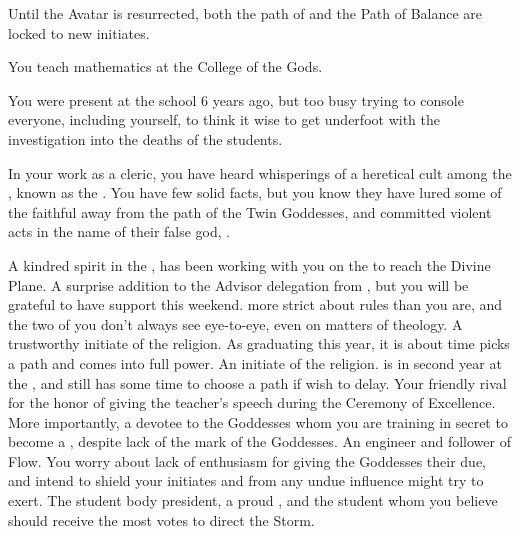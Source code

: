 \documentclass[char]{GL2020}
\begin{document}
\begin{itemz}[Notes]
	\item Until the \cEbb{} Avatar is resurrected, both the path of \cEbb{} and the Path of Balance are locked to new initiates.
	\item You teach mathematics at the College of the Gods.
	\item You were present at the school 6 years ago, but too busy trying to console everyone, including yourself, to think it wise to get underfoot with the investigation into the deaths of the students. 
	\item In your work as a cleric, you have heard whisperings of a heretical cult among the \pShip{}, known as the \pGoaties{}. You have few solid facts, but you know they have lured some of the faithful away from the path of the Twin Goddesses, and committed violent acts in the name of their false god, \cGenesis{}.
\end{itemz}

\begin{contacts}
	\contact{\cCurse{}} A kindred spirit in the \pFarm{}, \cCurse{} has been working with you on the \iBeansMB{} to reach the Divine Plane.
\contact{\cEbbPriest{}} A surprise addition to the Advisor delegation from \pShip{}, but you will be grateful to have \cEbbPriest{\their} support this weekend. \cEbbPriest{\Theyare} more strict about rules than you are, and the two of you don't always see eye-to-eye, even on matters of theology.
	\contact{\cInitiate{}} A trustworthy initiate of the \pShippies{} religion. As \cInitiate{\theyare} graduating this year, it is about time \cInitiate{} picks a path and comes into \cInitiate{\their} full power.
\contact{\cWarlordDaughter{}} An initiate of the \pShippies{} religion. \cWarlordDaughter{} is in \cWarlordDaughter{\their} second year at the \pSc{}, and still has some time to choose a path if \cWarlordDaughter{\they} wish\cWarlordDaughter{\pluralC} to delay.
\contact{\cPirate{}} Your friendly rival for the honor of giving the teacher's speech during the Ceremony of Excellence. More importantly, a devotee to the \pShip{} Goddesses whom you are training in secret to become a \cPirate{\cleric}, despite \cPirate{\their} lack of the mark of the Goddesses.
	\contact{\cBunker{}} An engineer and follower of Flow. You worry about \cBunker{\their} lack of enthusiasm for giving the Goddesses their due, and intend to shield your initiates \cInitiate{} and \cWarlordDaughter{} from any undue influence \cBunker{\they} might try to exert.
	\contact{\cPresident{}} The student body president, a proud \pShip{}, and the student whom you believe should receive the most votes to direct the Storm.
\end{contacts}
\end{document}
